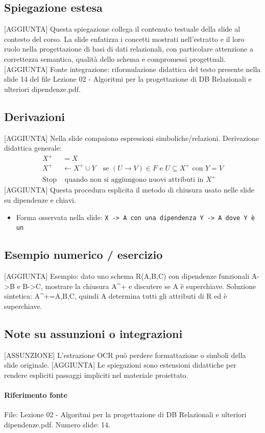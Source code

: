 \documentclass[11pt]{article}
\begin{document}
\subsection*{Spiegazione estesa}
[AGGIUNTA] Questa spiegazione collega il contenuto testuale della slide al contesto del corso. La slide enfatizza i concetti mostrati nell'estratto e il loro ruolo nella progettazione di basi di dati relazionali, con particolare attenzione a correttezza semantica, qualità dello schema e compromessi progettuali.
[AGGIUNTA] Fonte integrazione: riformulazione didattica del testo presente nella slide 14 del file Lezione 02 - Algoritmi per la progettazione di DB Relazionali e ulteriori dipendenze.pdf.
\subsection*{Derivazioni}
[AGGIUNTA] Nella slide compaiono espressioni simboliche/relazioni. Derivazione didattica generale:
\begin{align*}
X^+ &= X \\
X^+ &\leftarrow X^+ \cup Y \quad \text{se } (U \to V) \in F \text{ e } U \subseteq X^+ \text{ con } Y=V \\
\text{Stop} &\text{ quando non si aggiungono nuovi attributi in } X^+
\end{align*}
[AGGIUNTA] Questa procedura esplicita il metodo di chiusura usato nelle slide su dipendenze e chiavi.
\begin{itemize}[leftmargin=*]
\item Forma osservata nella slide: \texttt{X -> A con una dipendenza Y -> A dove Y è un}
\end{itemize}
\subsection*{Esempio numerico / esercizio}
[AGGIUNTA] Esempio: dato uno schema R(A,B,C) con dipendenze funzionali A->B e B->C, mostrare la chiusura A^+ e discutere se A è superchiave. Soluzione sintetica: A^+={A,B,C}, quindi A determina tutti gli attributi di R ed è superchiave.
\subsection*{Note su assunzioni o integrazioni}
[ASSUNZIONE] L'estrazione OCR può perdere formattazione o simboli della slide originale.
[AGGIUNTA] Le spiegazioni sono estensioni didattiche per rendere espliciti passaggi impliciti nel materiale proiettato.
\paragraph{Riferimento fonte} File: Lezione 02 - Algoritmi per la progettazione di DB Relazionali e ulteriori dipendenze.pdf. Numero slide: 14.
\end{document}
